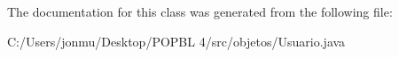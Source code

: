 The documentation for this class was generated from the following file\+:\begin{DoxyCompactItemize}
\item 
C\+:/\+Users/jonmu/\+Desktop/\+P\+O\+P\+B\+L 4/src/objetos/Usuario.\+java\end{DoxyCompactItemize}
